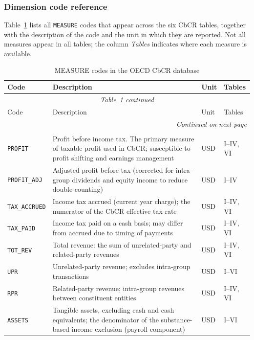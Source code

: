 \documentclass[11pt,a4paper]{article}
\newcommand{\code}[1]{\texttt{#1}}
\begin{document}
\subsubsection{Dimension code reference}\label{sec:dimensions}

Table~\ref{tab:measures} lists all \code{MEASURE} codes that appear across the six CbCR tables, together with the description of the code and the unit in which they are reported. Not all measures appear in all tables; the column \emph{Tables} indicates where each measure is available.

\begin{longtable}{@{}lp{6cm}lp{2.5cm}@{}}
\caption{MEASURE codes in the OECD CbCR database}\label{tab:measures}\\
\toprule
Code & Description & Unit & Tables \\
\midrule
\endfirsthead
\multicolumn{4}{c}{\textit{Table~\ref{tab:measures} continued}}\\
\toprule
Code & Description & Unit & Tables \\
\midrule
\endhead
\midrule
\multicolumn{4}{r}{\textit{Continued on next page}}\\
\endfoot
\bottomrule
\endlastfoot
\multicolumn{4}{l}{\textit{Financial aggregates}}\\
\code{PROFIT} & Profit before income tax. The primary measure of taxable profit used in CbCR; susceptible to profit shifting and earnings management & USD & I--IV, VI \\
\code{PROFIT\_ADJ} & Adjusted profit before tax (corrected for intra-group dividends and equity income to reduce double-counting) & USD & I--IV \\
\code{TAX\_ACCRUED} & Income tax accrued (current year charge); the numerator of the CbCR effective tax rate & USD & I--IV, VI \\
\code{TAX\_PAID}  & Income tax paid on a cash basis; may differ from accrued due to timing of payments & USD & I--IV, VI \\
\code{TOT\_REV}  & Total revenue: the sum of unrelated-party and related-party revenues & USD & I--IV, VI \\
\code{UPR}   & Unrelated-party revenue; excludes intra-group transactions & USD & I--VI \\
\code{RPR}   & Related-party revenue; intra-group revenues between constituent entities & USD & I--IV, VI \\
\code{ASSETS}   & Tangible assets, excluding cash and cash equivalents; the denominator of the substance-based income exclusion (payroll component) & USD & I--VI \\

\end{longtable}
\end{document}
